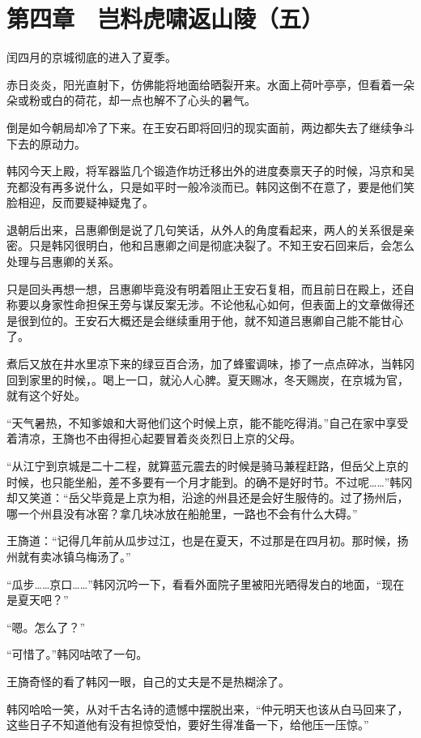 \section{第四章　岂料虎啸返山陵（五）}

闰四月的京城彻底的进入了夏季。

赤日炎炎，阳光直射下，仿佛能将地面给晒裂开来。水面上荷叶亭亭，但看着一朵朵或粉或白的荷花，却一点也解不了心头的暑气。

倒是如今朝局却冷了下来。在王安石即将回归的现实面前，两边都失去了继续争斗下去的原动力。

韩冈今天上殿，将军器监几个锻造作坊迁移出外的进度奏禀天子的时候，冯京和吴充都没有再多说什么，只是如平时一般冷淡而已。韩冈这倒不在意了，要是他们笑脸相迎，反而要疑神疑鬼了。

退朝后出来，吕惠卿倒是说了几句笑话，从外人的角度看起来，两人的关系很是亲密。只是韩冈很明白，他和吕惠卿之间是彻底决裂了。不知王安石回来后，会怎么处理与吕惠卿的关系。

只是回头再想一想，吕惠卿毕竟没有明着阻止王安石复相，而且前日在殿上，还自称要以身家性命担保王旁与谋反案无涉。不论他私心如何，但表面上的文章做得还是很到位的。王安石大概还是会继续重用于他，就不知道吕惠卿自己能不能甘心了。

煮后又放在井水里凉下来的绿豆百合汤，加了蜂蜜调味，掺了一点点碎冰，当韩冈回到家里的时候，。喝上一口，就沁人心脾。夏天赐冰，冬天赐炭，在京城为官，就有这个好处。

“天气暑热，不知爹娘和大哥他们这个时候上京，能不能吃得消。”自己在家中享受着清凉，王旖也不由得担心起要冒着炎炎烈日上京的父母。

“从江宁到京城是二十二程，就算蓝元震去的时候是骑马兼程赶路，但岳父上京的时候，也只能坐船，差不多要有一个月才能到。的确不是好时节。不过呢……”韩冈却又笑道：“岳父毕竟是上京为相，沿途的州县还是会好生服侍的。过了扬州后，哪一个州县没有冰窑？拿几块冰放在船舱里，一路也不会有什么大碍。”

王旖道：“记得几年前从瓜步过江，也是在夏天，不过那是在四月初。那时候，扬州就有卖冰镇乌梅汤了。”

“瓜步……京口……”韩冈沉吟一下，看看外面院子里被阳光晒得发白的地面，“现在是夏天吧？”

“嗯。怎么了？”

“可惜了。”韩冈咕哝了一句。

王旖奇怪的看了韩冈一眼，自己的丈夫是不是热糊涂了。

韩冈哈哈一笑，从对千古名诗的遗憾中摆脱出来，“仲元明天也该从白马回来了，这些日子不知道他有没有担惊受怕，要好生得准备一下，给他压一压惊。”

